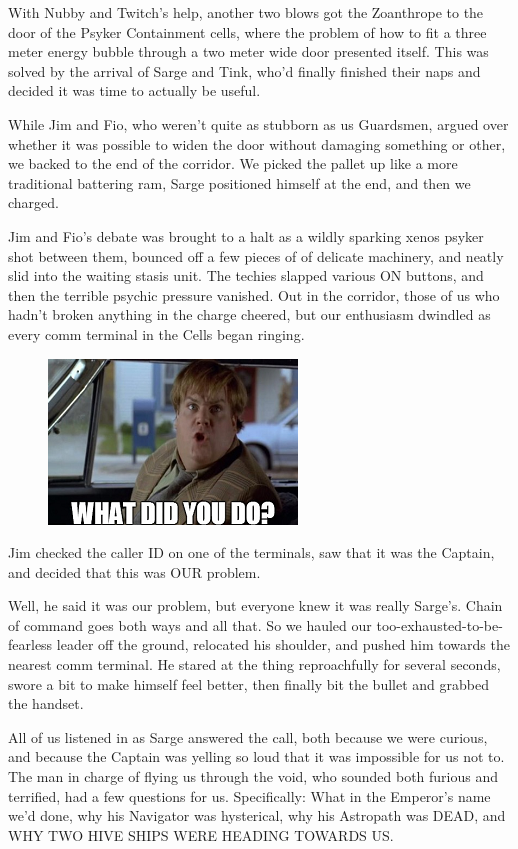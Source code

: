 With Nubby and Twitch's help, another two blows got the Zoanthrope to the door of the Psyker Containment cells, where the problem of how to fit a three meter energy bubble through a two meter wide door presented itself. 
This was solved by the arrival of Sarge and Tink, who'd finally finished their naps and decided it was time to actually be useful.

While Jim and Fio, who weren't quite as stubborn as us Guardsmen, argued over whether it was possible to widen the door without damaging something or other, we backed to the end of the corridor. 
We picked the pallet up like a more traditional battering ram, Sarge positioned himself at the end, and then we charged.

Jim and Fio's debate was brought to a halt as a wildly sparking xenos psyker shot between them, bounced off a few pieces of of delicate machinery, and neatly slid into the waiting stasis unit. 
The techies slapped various ON buttons, and then the terrible psychic pressure vanished. 
Out in the corridor, those of us who hadn't broken anything in the charge cheered, but our enthusiasm dwindled as every comm terminal in the Cells began ringing.
\begin{figure}
	\begin{center}
		\includegraphics[width=\figwidth]{pics/12/69.png}
	\end{center}
\end{figure}
Jim checked the caller ID on one of the terminals, saw that it was the Captain, and decided that this was OUR problem. 


Well, he said it was our problem, but everyone knew it was really Sarge's. 
Chain of command goes both ways and all that. 
So we hauled our too-exhausted-to-be-fearless leader off the ground, relocated his shoulder, and pushed him towards the nearest comm terminal. 
He stared at the thing reproachfully for several seconds, swore a bit to make himself feel better, then finally bit the bullet and grabbed the handset.

All of us listened in as Sarge answered the call, both because we were curious, and because the Captain was yelling so loud that it was impossible for us not to. 
The man in charge of flying us through the void, who sounded both furious and terrified, had a few questions for us. 
Specifically: 
What in the Emperor's name we'd done, why his Navigator was hysterical, why his Astropath was DEAD, and WHY TWO HIVE SHIPS WERE HEADING TOWARDS US.


